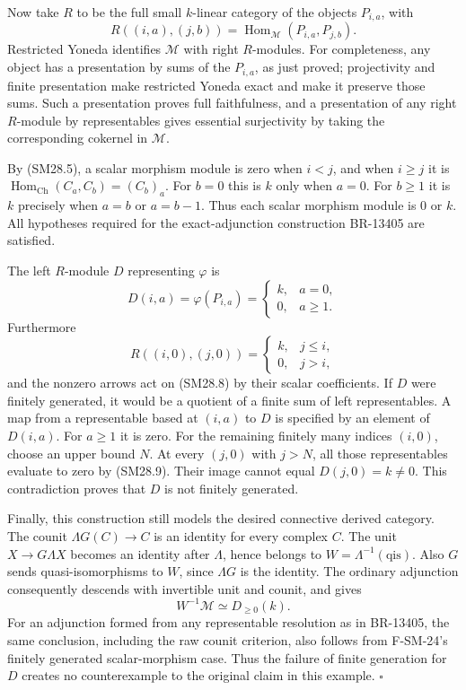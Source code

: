 \documentclass[11pt,a4paper]{article}
\theoremstyle{definition}\newtheorem{definition}[theorem]{Definition}
\theoremstyle{remark}\newtheorem{remark}[theorem]{Remark}
\begin{document}
Now take \(R\) to be the full small \(k\)-linear category of the
objects \(P_{i,a}\), with
\[
 R((i,a),(j,b))=
 \operatorname{Hom}_{\mathcal M}(P_{i,a},P_{j,b}).
\]
Restricted Yoneda identifies \(\mathcal M\) with right \(R\)-modules.
For completeness, any object has a presentation by sums of the
\(P_{i,a}\), as just proved; projectivity and finite presentation make
restricted Yoneda exact and make it preserve those sums.  Such a
presentation proves full faithfulness, and a presentation of any
right \(R\)-module by representables gives essential surjectivity
by taking the corresponding cokernel in \(\mathcal M\).

By (SM28.5), a scalar morphism module is zero when \(i<j\), and
when \(i\ge j\) it is
\(\operatorname{Hom}_{\mathrm{Ch}}(C_a,C_b)=(C_b)_a\).
For \(b=0\) this is \(k\) only when \(a=0\).
For \(b\ge1\) it is \(k\) precisely when \(a=b\) or \(a=b-1\).
Thus each scalar morphism module is \(0\) or \(k\).
All hypotheses required for the exact-adjunction construction
BR-13405 are satisfied.

The left \(R\)-module \(D\) representing \(\varphi\) is
\[
 D(i,a)=\varphi(P_{i,a})=
 \begin{cases}k,&a=0,\\0,&a\ge1.\end{cases}
 \tag{SM28.8}
\]
Furthermore
\[
 R((i,0),(j,0))=
 \begin{cases}k,&j\le i,\\0,&j>i,\end{cases}
 \tag{SM28.9}
\]
and the nonzero arrows act on (SM28.8) by their scalar coefficients.
If \(D\) were finitely generated, it would be a quotient of a finite
sum of left representables.  A map from a representable based at
\((i,a)\) to \(D\) is specified by an element of \(D(i,a)\).
For \(a\ge1\) it is zero.  For the remaining finitely many indices
\((i,0)\), choose an upper bound \(N\).  At every \((j,0)\) with
\(j>N\), all those representables evaluate to zero by (SM28.9).
Their image cannot equal \(D(j,0)=k\ne0\).
This contradiction proves that \(D\) is not finitely generated.

Finally, this construction still models the desired connective
derived category.  The counit
\(\Lambda G(C)\to C\) is an identity for every complex \(C\).
The unit \(X\to G\Lambda X\) becomes an identity after \(\Lambda\),
hence belongs to \(W=\Lambda^{-1}(\mathrm{qis})\).
Also \(G\) sends quasi-isomorphisms to \(W\), since \(\Lambda G\)
is the identity.  The ordinary adjunction consequently descends
with invertible unit and counit, and gives
\[
 W^{-1}\mathcal M\simeq D_{\ge0}(k).
\]
For an adjunction formed from any representable resolution as in
BR-13405, the same conclusion, including the raw counit criterion,
also follows from F-SM-24's finitely generated scalar-morphism case.
Thus the failure of finite generation for \(D\) creates no
counterexample to the original claim in this example. \(\square\)
\end{document}
